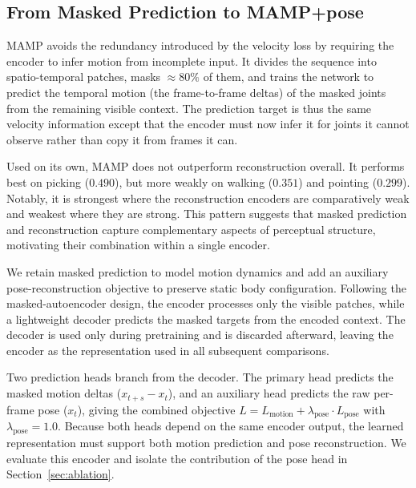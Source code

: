 \documentclass[letterpaper]{article} %
\begin{document}

\subsection{From Masked Prediction to MAMP+pose}
\label{sec:step4}
\label{sec:mamp-pose}


MAMP \citep{mao2023mamp} avoids the redundancy introduced by the velocity loss by requiring the encoder to infer motion from incomplete input. It divides the sequence into spatio-temporal patches, masks $\approx 80\%$ of them, and trains the network to predict the temporal motion (the frame-to-frame deltas) of the masked joints from the remaining visible context. The prediction target is thus the same velocity information except that the encoder must now infer it for joints it cannot observe rather than copy it from frames it can.


Used on its own, MAMP does not outperform reconstruction overall. It performs best on picking ($0.490$), but more weakly on walking ($0.351$) and pointing ($0.299$). Notably, it is strongest where the reconstruction encoders are comparatively weak and weakest where they are strong. This pattern suggests that masked prediction and reconstruction capture complementary aspects of perceptual structure, motivating their combination within a single encoder.

We retain masked prediction to model motion dynamics and add an auxiliary pose-reconstruction objective to preserve static body configuration. Following the masked-autoencoder design, the encoder processes only the visible patches, while a lightweight decoder predicts the masked targets from the encoded context. The decoder is used only during pretraining and is discarded afterward, leaving the encoder as the representation used in all subsequent comparisons. 

Two prediction heads branch from the decoder. The primary head predicts the masked motion deltas ($x_{t+s}-x_t$), and an auxiliary head predicts the raw per-frame pose ($x_t$), giving the combined objective $L = L_{\text{motion}} + \lambda_{\text{pose}} \cdot L_{\text{pose}}$ with $\lambda_{\text{pose}}=1.0$. Because both heads depend on the same encoder output, the learned representation must support both motion prediction and pose reconstruction. We evaluate this encoder and isolate the contribution of the pose head in Section~\ref{sec:ablation}.
\end{document}
